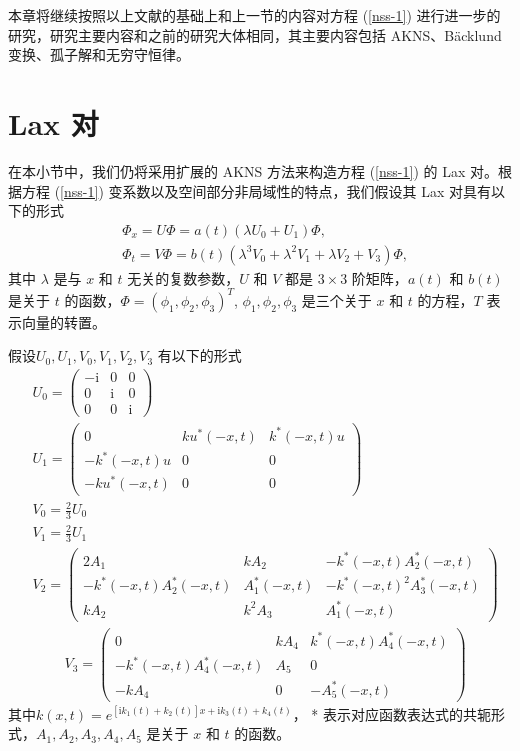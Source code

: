 本章将继续按照以上文献的基础上和上一节的内容对方程 (\ref{nss-1}) 进行进一步的研究，研究主要内容和之前的研究大体相同，其主要内容包括 AKNS、B\"{a}cklund 变换、孤子解和无穷守恒律。

\section{Lax 对}
在本小节中，我们仍将采用扩展的 AKNS 方法来构造方程 (\ref{nss-1}) 的 Lax 对。根据方程 (\ref{nss-1}) 变系数以及空间部分非局域性的特点，我们假设其 Lax 对具有以下的形式
\begin{align}
  & \Phi_{x} = U\Phi = a(t)(\lambda U_{0} + U_{1})\Phi, \label{nss-2} \\
  & \Phi_{t} = V\Phi = b(t)(\lambda^{3}V_{0} + \lambda^{2}V_{1} + \lambda V_{2} + V_{3})\Phi, \label{nss-3}
\end{align}
其中 $\lambda$ 是与 $x$ 和 $t$ 无关的复数参数，$U$ 和 $V$ 都是 $3\times3$ 阶矩阵，$a(t)$ 和 $b(t)$ 是关于 $t$ 的函数，$\Phi=(\phi_1, \phi_2, \phi_3)^T$, $\phi_1, \phi_2, \phi_3$ 是三个关于 $x$ 和 $t$ 的方程，$T$ 表示向量的转置。

假设$U_{0}, U_{1}, V_{0}, V_{1}, V_{2}, V_{3}$ 有以下的形式
\begin{align}
  & U_{0} = \begin{pmatrix}
             -\mathrm{i} & 0 & 0 \\
              0 & \mathrm{i} & 0 \\
              0 & 0 & \mathrm{i}
            \end{pmatrix} \\
  & U_{1} = \begin{pmatrix}
              0 & ku^{*}(-x,t) & k^{*}(-x,t)u \\
              -k^{*}(-x,t)u & 0 & 0 \\
              -ku^{*}(-x,t) & 0 & 0
            \end{pmatrix} \\
  & V_{0} = \frac{2}{3}U_{0} \\
  & V_{1} = \frac{2}{3}U_{1} \\
  & V_{2} = \begin{pmatrix}
              2A_{1} & kA_{2} & -k^{*}(-x,t)A_{2}^{*}(-x,t) \\
              -k^{*}(-x,t)A_{2}^{*}(-x,t) & A_{1}^{*}(-x,t) & -k^{*}(-x,t)^{2}A_{3}^{*}(-x,t) \\
              kA_{2} & k^{2}A_{3} & A_{1}^{*}(-x,t)
            \end{pmatrix}
\end{align}
\begin{align}
   & V_{3} = \begin{pmatrix}
              0 & kA_{4} & k^{*}(-x,t)A_{4}^{*}(-x,t) \\
              -k^{*}(-x,t)A_{4}^{*}(-x,t) & A_{5} & 0 \\
              -kA_{4} & 0 & -A_{5}^{*}(-x,t)
            \end{pmatrix}
\end{align}
其中$k(x,t)= e^{\left[\mathrm{i}k_{1}(t) + k_2(t)\right]x + \mathrm{i}k_{3}(t) + k_4(t)}$，  * 表示对应函数表达式的共轭形式，$A_1, A_2, A_3, A_4, A_5$ 是关于 $x$ 和 $t$ 的函数。


